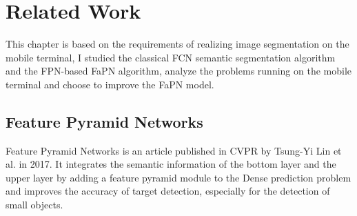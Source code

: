 \section{Related Work}
This chapter is based on the requirements of realizing image segmentation on the mobile terminal, I studied the classical FCN \cite{long2015fully} semantic segmentation algorithm and the FPN-based FaPN \cite{huang2021fapn} algorithm, analyze the problems running on the mobile terminal and choose to improve the FaPN model.


\subsection{Feature Pyramid Networks}
Feature Pyramid Networks \cite{lin2017feature} is an article published in CVPR by Tsung-Yi Lin et al. in 2017. It integrates the semantic information of the bottom layer and the upper layer by adding a feature pyramid module to the Dense prediction problem and improves the accuracy of target detection, especially for the detection of small objects.

